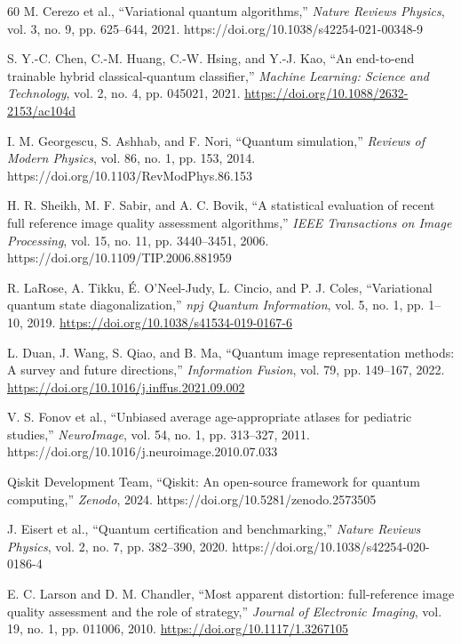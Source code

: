 \documentclass[11pt,a4paper]{article}
\begin{document}
\begin{thebibliography}{60}
M. Cerezo et al., ``Variational quantum algorithms,'' \textit{Nature Reviews Physics}, vol. 3, no. 9, pp. 625--644, 2021. https://doi.org/10.1038/s42254-021-00348-9

S. Y.-C. Chen, C.-M. Huang, C.-W. Hsing, and Y.-J. Kao, ``An end-to-end trainable hybrid classical-quantum classifier,'' \textit{Machine Learning: Science and Technology}, vol. 2, no. 4, pp. 045021, 2021. \url{https://doi.org/10.1088/2632-2153/ac104d}


I. M. Georgescu, S. Ashhab, and F. Nori, ``Quantum simulation,'' \textit{Reviews of Modern Physics}, vol. 86, no. 1, pp. 153, 2014. https://doi.org/10.1103/RevModPhys.86.153

H. R. Sheikh, M. F. Sabir, and A. C. Bovik, ``A statistical evaluation of recent full reference image quality assessment algorithms,'' \textit{IEEE Transactions on Image Processing}, vol. 15, no. 11, pp. 3440--3451, 2006. https://doi.org/10.1109/TIP.2006.881959

R. LaRose, A. Tikku, É. O'Neel-Judy, L. Cincio, and P. J. Coles, ``Variational quantum state diagonalization,'' \textit{npj Quantum Information}, vol. 5, no. 1, pp. 1--10, 2019. \url{https://doi.org/10.1038/s41534-019-0167-6}

L. Duan, J. Wang, S. Qiao, and B. Ma, ``Quantum image representation methods: A survey and future directions,'' \textit{Information Fusion}, vol. 79, pp. 149--167, 2022. \url{https://doi.org/10.1016/j.inffus.2021.09.002}

V. S. Fonov et al., ``Unbiased average age-appropriate atlases for pediatric studies,'' \textit{NeuroImage}, vol. 54, no. 1, pp. 313--327, 2011. https://doi.org/10.1016/j.neuroimage.2010.07.033

Qiskit Development Team, ``Qiskit: An open-source framework for quantum computing,'' \textit{Zenodo}, 2024. https://doi.org/10.5281/zenodo.2573505

J. Eisert et al., ``Quantum certification and benchmarking,'' \textit{Nature Reviews Physics}, vol. 2, no. 7, pp. 382--390, 2020. https://doi.org/10.1038/s42254-020-0186-4

E. C. Larson and D. M. Chandler, ``Most apparent distortion: full-reference image quality assessment and the role of strategy,'' \textit{Journal of Electronic Imaging}, vol. 19, no. 1, pp. 011006, 2010. \url{https://doi.org/10.1117/1.3267105}


\end{thebibliography}
\end{document}
